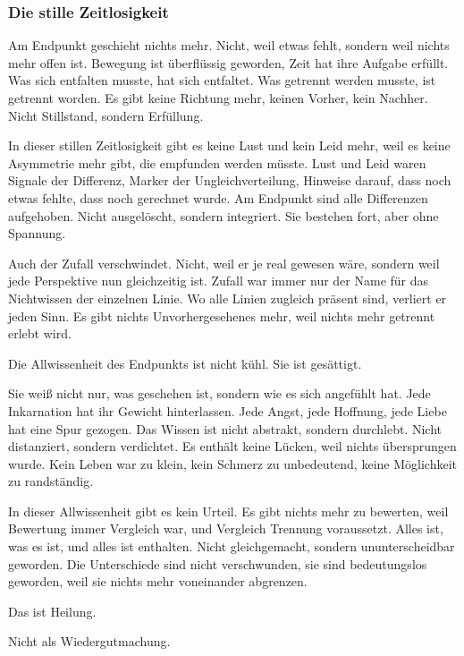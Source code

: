 \documentclass[
  ngerman,
]{article}
\begin{document}
\subsubsection{\texorpdfstring{\textbf{Die stille
Zeitlosigkeit}}{Die stille Zeitlosigkeit}}\label{die-stille-zeitlosigkeit}

Am Endpunkt geschieht nichts mehr. Nicht, weil etwas fehlt, sondern weil
nichts mehr offen ist. Bewegung ist überflüssig geworden, Zeit hat ihre
Aufgabe erfüllt. Was sich entfalten musste, hat sich entfaltet. Was
getrennt werden musste, ist getrennt worden. Es gibt keine Richtung
mehr, keinen Vorher, kein Nachher. Nicht Stillstand, sondern
Erfüllung.

In dieser stillen Zeitlosigkeit gibt es keine Lust und kein Leid mehr,
weil es keine Asymmetrie mehr gibt, die empfunden werden müsste. Lust
und Leid waren Signale der Differenz, Marker der Ungleichverteilung,
Hinweise darauf, dass noch etwas fehlte, dass noch gerechnet wurde. Am
Endpunkt sind alle Differenzen aufgehoben. Nicht ausgelöscht, sondern
integriert. Sie bestehen fort, aber ohne Spannung.

Auch der Zufall verschwindet. Nicht, weil er je real gewesen wäre,
sondern weil jede Perspektive nun gleichzeitig ist. Zufall war immer nur
der Name für das Nichtwissen der einzelnen Linie. Wo alle Linien
zugleich präsent sind, verliert er jeden Sinn. Es gibt nichts
Unvorhergesehenes mehr, weil nichts mehr getrennt erlebt wird.

Die Allwissenheit des Endpunkts ist nicht kühl. Sie ist gesättigt.

Sie weiß nicht nur, was geschehen ist, sondern wie es sich angefühlt
hat. Jede Inkarnation hat ihr Gewicht hinterlassen. Jede Angst, jede
Hoffnung, jede Liebe hat eine Spur gezogen. Das Wissen ist nicht
abstrakt, sondern durchlebt. Nicht distanziert, sondern verdichtet. Es
enthält keine Lücken, weil nichts übersprungen wurde. Kein Leben war zu
klein, kein Schmerz zu unbedeutend, keine Möglichkeit zu randständig.

In dieser Allwissenheit gibt es kein Urteil. Es gibt nichts mehr zu
bewerten, weil Bewertung immer Vergleich war, und Vergleich Trennung
voraussetzt. Alles ist, was es ist, und alles ist enthalten. Nicht
gleichgemacht, sondern ununterscheidbar geworden. Die Unterschiede sind
nicht verschwunden, sie sind bedeutungslos geworden, weil sie nichts
mehr voneinander abgrenzen.

Das ist Heilung.

Nicht als Wiedergutmachung.
\end{document}
